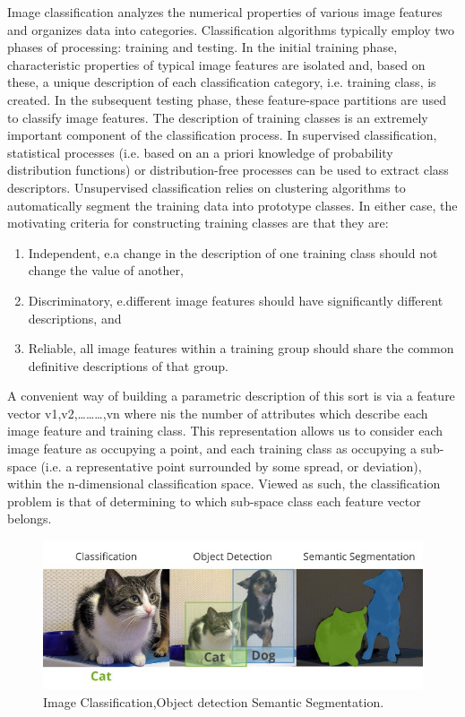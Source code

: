 \documentclass{article}
\begin{document}
Image classification analyzes the numerical properties of various image features and organizes data into categories. Classification algorithms typically employ two phases of processing: training and testing. In the initial training phase, characteristic properties of typical image features are isolated and, based on these, a unique description of each classification category, i.e. training class, is created. In the subsequent testing phase, these feature-space partitions are used to classify image features. The description of training classes is an extremely important component of the classification process. In supervised classification, statistical processes (i.e. based on an a priori knowledge of probability distribution functions) or distribution-free processes can be used to extract class descriptors. Unsupervised classification relies on clustering algorithms to automatically segment the training data into prototype classes. In either case, the motivating criteria for constructing training classes are that they are:

\begin{enumerate}
\item Independent, e.a change in the description of one training class should not change the value of another,

\item Discriminatory, e.different image features should have significantly different descriptions, and

\item Reliable, all image features within a training group should share the common definitive descriptions of that group.

\end{enumerate}

A convenient way of building a parametric description of this sort is via a feature vector
 ​v1,v2,………,vn 
 ​where ​n​is the number of attributes which describe each image feature and training class. This representation allows us to consider each image feature as occupying a point, and each training class as occupying a sub-space (i.e. a representative point surrounded by some spread, or deviation), within the n-dimensional classification space. Viewed as such, the classification problem is that of determining to which sub-space class each feature vector belongs.
 
\begin{figure}[H]
  \centering
  \includegraphics[width=0.7\linewidth]{images/classification_detection_segmentaion_comparisons.jpeg}
   \caption{Image Classification,Object detection Semantic Segmentation.}
\end{figure}
\end{document}
